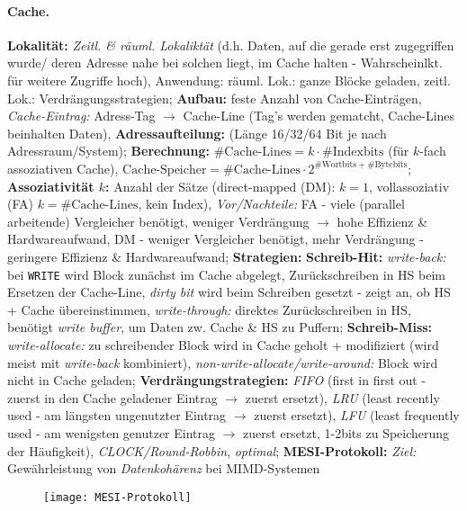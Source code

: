 \documentclass[8pt,a4paper]{article}
\begin{document}
\begin{multicols}{2}
\paragraph{Cache.} \textbf{Lokalität:} \emph{Zeitl. \&
  räuml. Lokaliktät} (d.h. Daten, auf die gerade erst zugegriffen
wurde/ deren Adresse nahe bei solchen liegt, im Cache halten -
Wahrscheinlkt. für weitere Zugriffe hoch), Anwendung: räuml. Lok.:
ganze Blöcke geladen, zeitl. Lok.: Verdrängungsstrategien;
\textbf{Aufbau:} feste Anzahl von Cache-Einträgen, \emph{Cache-Eintrag:}
Adress-Tag $\rightarrow$ Cache-Line (Tag's werden gematcht,
Cache-Lines beinhalten Daten), \textbf{Adressaufteilung:}  (Länge
16/32/64 Bit je nach Adressraum/System); \textbf{Berechnung:}
$\#\text{Cache-Lines}=k\cdot\#\text{Indexbits} $ (für $k$-fach
assoziativen Cache),
$\text{Cache-Speicher}=\#\text{Cache-Lines}\cdot2^{\#\text{Wortbits}+\#\text{Bytebits}}$;
\textbf{Assoziativität $k$:} Anzahl der Sätze (direct-mapped (DM):
$k=1$, vollassoziativ (FA) $k=\#\text{Cache-Lines}$, kein Index),
\emph{Vor/Nachteile:} FA - viele (parallel arbeitende) Vergleicher
benötigt, weniger Verdrängung $\rightarrow$ hohe Effizienz \&
Hardwareaufwand, DM - weniger Vergleicher benötigt, mehr Verdrängung -
geringere Effizienz \& Hardwareaufwand; \textbf{Strategien:}
\textbf{Schreib-Hit:} \emph{write-back:} bei \texttt{WRITE} wird
Block zunächst im Cache abgelegt, Zurückschreiben in HS beim Ersetzen
der Cache-Line, \emph{dirty bit} wird beim Schreiben gesetzt - zeigt
an, ob HS + Cache übereinstimmen, \emph{write-through:} direktes
Zurückschreiben in HS, benötigt \emph{write buffer}, um Daten
zw. Cache \& HS zu Puffern; \textbf{Schreib-Miss:}
\emph{write-allocate:} zu schreibender Block wird in Cache geholt +
modifiziert (wird meist mit \emph{write-back} kombiniert),
\emph{non-write-allocate/write-around:} Block wird nicht in Cache geladen; 
\textbf{Verdrängungstrategien:} \emph{FIFO} (first in first out - zuerst in den Cache geladener Eintrag $\rightarrow$ zuerst ersetzt), \emph{LRU} (least recently used - am längsten ungenutzter Eintrag $\rightarrow$ zuerst ersetzt), \emph{LFU} (least frequently used - am wenigsten genutzer Eintrag $\rightarrow$ zuerst ersetzt, 1-2bits zu Speicherung der Häufigkeit), \emph{CLOCK/Round-Robbin}, \emph{optimal};
\textbf{MESI-Protokoll:} \emph{Ziel:} Gewährleistung von \emph{Datenkohärenz} bei MIMD-Systemen

\begin{figure}[H]
  \centering
  \texttt{[image: MESI-Protokoll]}
\end{figure}


\end{multicols}
\end{document}
